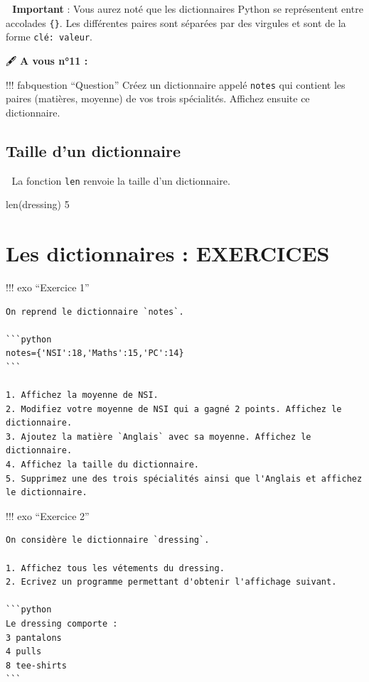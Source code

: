 \documentclass[
]{article}
\newenvironment{Shaded}{}{}
\newcommand{\BuiltInTok}[1]{#1}
\newcommand{\DecValTok}[1]{\textcolor[rgb]{0.25,0.63,0.44}{#1}}
\newcommand{\NormalTok}[1]{#1}
\begin{document}
\textbf{💜 Important} : Vous aurez noté que les dictionnaires Python se
représentent entre accolades \texttt{\{\}}. Les différentes paires sont
séparées par des virgules et sont de la forme \texttt{clé:\ valeur}.

🖋 \textbf{A vous n°11 :}

!!! fabquestion ``Question'' Créez un dictionnaire appelé \texttt{notes}
qui contient les paires (matières, moyenne) de vos trois spécialités.
Affichez ensuite ce dictionnaire.

\hypertarget{taille-dun-dictionnaire}{%
\subsection{Taille d'un dictionnaire}\label{taille-dun-dictionnaire}}

💜 La fonction \texttt{len} renvoie la taille d'un dictionnaire.

\begin{Shaded}
\begin{Highlighting}[]
\BuiltInTok{len}\NormalTok{(dressing)}
\DecValTok{5}
\end{Highlighting}
\end{Shaded}

\hypertarget{les-dictionnaires-exercices}{%
\section{Les dictionnaires :
EXERCICES}\label{les-dictionnaires-exercices}}

!!! exo ``Exercice 1''

\begin{verbatim}
On reprend le dictionnaire `notes`.

```python
notes={'NSI':18,'Maths':15,'PC':14}
```

1. Affichez la moyenne de NSI.  
2. Modifiez votre moyenne de NSI qui a gagné 2 points. Affichez le dictionnaire.  
3. Ajoutez la matière `Anglais` avec sa moyenne. Affichez le dictionnaire.  
4. Affichez la taille du dictionnaire.  
5. Supprimez une des trois spécialités ainsi que l'Anglais et affichez le dictionnaire.
\end{verbatim}

!!! exo ``Exercice 2''

\begin{verbatim}
On considère le dictionnaire `dressing`.

1. Affichez tous les vétements du dressing.  
2. Ecrivez un programme permettant d'obtenir l'affichage suivant.

```python
Le dressing comporte : 
3 pantalons
4 pulls
8 tee-shirts
```
\end{verbatim}
\end{document}

